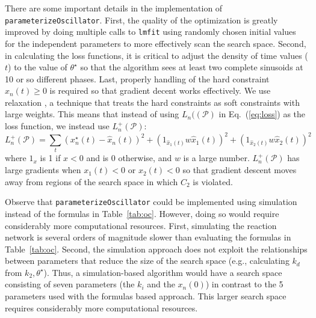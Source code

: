 \documentclass{bmcart}
\newcommand{\eqn}[1]{Eq.~(\ref{#1})}
\newcommand{\tab}[1]{Table~\ref{#1}}
\begin{document}
There are some important details in the implementation of {\tt parameterizeOscillator}. First, the quality of the optimization is greatly improved by doing multiple calls to {\tt lmfit} using randomly chosen initial values for the independent parameters to more effectively scan the search space. Second, in calculating the loss functions, it is critical to adjust the density of time values ($t$) to the value of $\theta^{\star}$ so that the algorithm sees at least two complete sinusoids at 10 or so different phases. Last, properly handling of the hard constraint $x_n(t) \geq 0$ is required so that gradient decent works effectively. We use relaxation \cite{boyd_2004}, a technique that treats the hard constraints as soft constraints with large weights. This means that instead of using $L_n((\mathcal{P})$ in \eqn{eq:loss} as the loss function, we instead use $L^+_n(\mathcal{P})$:
\begin{equation}
   L_n^{+} (\mathcal{P}) = \sum_t \left( x^{\star}_n(t) -\hat{x}_n(t) \right) ^ 2  + \left(1_{\hat{x}_1(t)} w \hat{x}_1 (t) \right)^2 + \left( 1_{\hat{x}_2(t)} w \hat{x}_2 (t) \right)^2
\end{equation}
where $1_x$ is 1 if $x < 0$ and is $0$ otherwise, and $w$ is a large number.
$L_n^{+} (\mathcal{P})$ has large gradients when $x_1(t) <0$ or $x_2(t) < 0$ so that gradient descent moves away from regions of the search space in which $C_2$ is violated.

Observe that {\tt parameterizeOscillator} could be implemented using simulation instead of the formulas in \tab{tab:oc}. However, doing so would require considerably more computational resources. First, simulating the reaction network is several orders of magnitude slower than evaluating the formulas in \tab{tab:oc}. Second, the simulation approach does not exploit the relationships between parameters that reduce the size of the search space (e.g.,  calculating $k_d$ from $k_2, \theta^{\star}$). Thus, a simulation-based algorithm would have a search space consisting of seven parameters (the $k_i$ and the $x_n(0)$) in contrast to the 5 parameters used with the formulas based approach. This larger search space requires considerably more computational resources.

\end{document}
